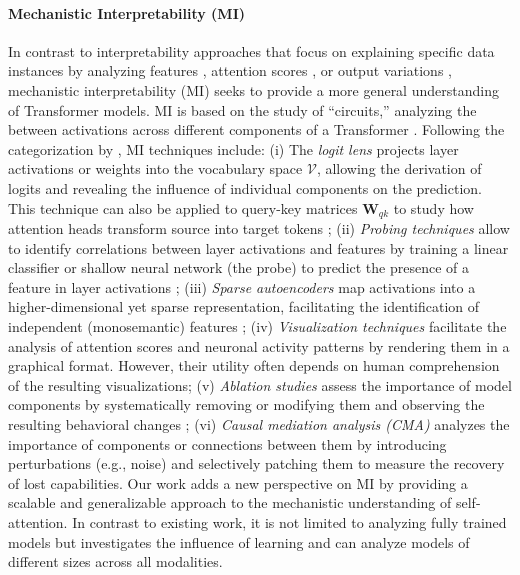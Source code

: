 %
\paragraph{Mechanistic Interpretability (MI)}
%
In contrast to interpretability approaches that focus on explaining specific data instances by analyzing features \citep{Wu_Chen_2020, Lundstrom_Huang_2022}, attention scores \citep{Hoover_Strobelt_2020, Barkan_2021, Yeh_Chen_2023}, or output variations \citep{Jin_Jin_2020, Wang_Xu_2022}, mechanistic interpretability (MI) seeks to provide a more general understanding of Transformer models.
%
MI is based on the study of ``circuits,'' analyzing the between activations across different components of a Transformer  \citep{olahZoomIntroductionCircuits2020}.
%
Following the categorization by \citep{Rai_Zhou_Feng_Saparov_Yao_2024}, MI techniques include:
(i)
The \emph{logit lens} \citep{nostalgebraist_2020, Geva_Schuster_2021} projects layer activations or weights into the vocabulary space $\mathcal{V}$, allowing the derivation of logits and revealing the influence of individual components on the prediction.
This technique can also be applied to query-key matrices $\bm{W}_{qk}$ to study how attention heads transform source into target tokens \citep{darAnalyzingTransformersEmbedding2023};
%
(ii)
\emph{Probing techniques} allow to identify correlations between layer activations and features by training a linear classifier or shallow neural network (the probe) to predict the presence of a feature in layer activations \citep{Dalvi_Durrani_2019, gurnee2023finding};
%
(iii)
\emph{Sparse autoencoders} map activations into a higher-dimensional yet sparse representation, facilitating the identification of independent (monosemantic) features \citep{Huben_Cunningham_Smith_Ewart_Sharkey_2024, bricken2023monosemanticity};
%
(iv)
\emph{Visualization techniques} facilitate the analysis of attention scores \citep{olssonIncontextLearningInduction2022, Lieberum_Rahtz_Kramár_Nanda_Irving_Shah_Mikulik_2023} and neuronal activity patterns \citep{Elhage_Softmax_2023} by rendering them in a graphical format. However, their utility often depends on human comprehension of the resulting visualizations;
%
(v)
\emph{Ablation studies} assess the importance of model components by systematically removing or modifying them and observing the resulting behavioral changes \citep{olssonIncontextLearningInduction2022, wangInterpretabilityWildCircuit2022};
%
(vi)
\emph{Causal mediation analysis (CMA)} analyzes the importance of components \citep{Vig_Gehrmann_Belinkov_Qian_Nevo_Singer_Shieber_2020, Meng_Bau_Andonian_Belinkov_2022} or connections \citep{wangInterpretabilityWildCircuit2022, Goldowsky-Dill_MacLeod_Sato_Arora_2023} between them by introducing perturbations (e.g., noise) and selectively patching them to measure the recovery of lost capabilities.
%
Our work adds a new perspective on MI by providing a scalable and generalizable approach to the mechanistic understanding of self-attention.
In contrast to existing work, it is not limited to analyzing fully trained models but investigates the influence of learning and can analyze models of different sizes across all modalities.


